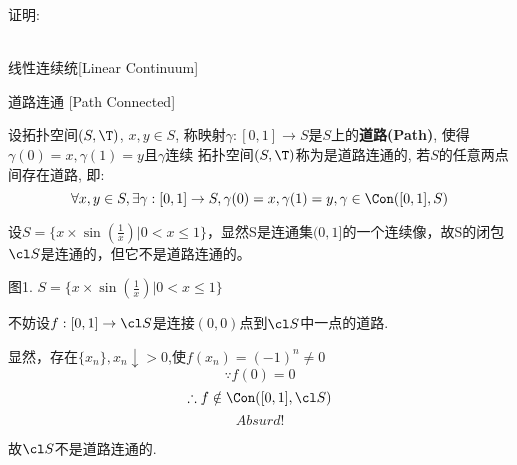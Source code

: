 \documentclass[UTF8]{ctexart}
\begin{document}
            证明: \[\]\\

            \begin{dfn}
                {线性连续统}[Linear Continuum]
                
            \end{dfn}

            \begin{dfn}
                {道路连通}
                [Path Connected]

                设拓扑空间$(S,\T)$, $x,y\in S$, 称映射$\gamma:[0,1]\to S$是$S$上的\textbf{道路(Path)}, 使得\(\gamma(0)=x,\gamma(1)=y\)且\(\gamma\)连续
                拓扑空间$(S,\T)$称为是道路连通的, 若$S$的任意两点间存在道路, 即:
                \[\forall x,y\in S, \exists\gamma:[0,1]\to S,\gamma(0)=x,\gamma(1)=y,\gamma\in\Con([0,1],S)\]
            \end{dfn}

            \begin{example}
                设\(S=\{x\times\sin(\frac{1}{x})|0<x\leq1\}\)，显然S是连通集\((0,1]\)的一个连续像，故S的闭包\(\cl S\)是连通的，但它不是道路连通的。


                \begin{center}
                    图1. \(S=\{x\times\sin(\frac{1}{x})|0<x\leq1\}\)
                \end{center}
            \end{example}
            
            \begin{prf}
                不妨设\(f:[0,1]\to \cl S\)是连接\((0,0)\)点到\(\cl S\)中一点的道路.

                显然，存在\(\{x_n\},x_n\downarrow>0\),使\(f(x_n)=(-1)^n\neq0\)
                \[\because f(0)=0\]
                \[\therefore f\notin\Con([0,1],\cl S)\]
                \[Absurd!\]

                故\(\cl S\)不是道路连通的.
            \end{prf}
\end{document}
